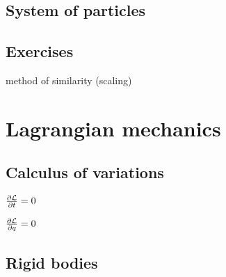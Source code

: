 \documentclass{../note}
\begin{document}
\section{System of particles}
\begin{prb}
\end{prb}
\begin{prb}[Collisions]
\end{prb}
\begin{prb}
\end{prb}
\begin{prb}
\end{prb}

\section*{Exercises}
method of similarity (scaling)



\chapter{Lagrangian mechanics}
\section{Calculus of variations}
\begin{prb}
\end{prb}
\begin{prb}
$\pd{\cL}{t}=0$
\end{prb}
\begin{prb}
$\pd{\cL}{q}=0$
\end{prb}
\begin{prb}
\end{prb}
\section{Rigid bodies}
\begin{prb}
\end{prb}
\begin{prb}
\end{prb}
\begin{prb}
\end{prb}
\end{document}
